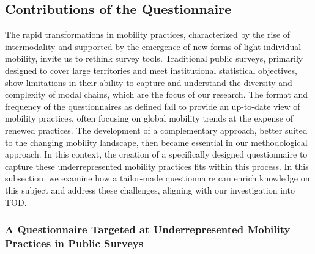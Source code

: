 \begin{refsegment}
\subsection{Contributions of the Questionnaire
    \label{chap3:apports-questionnaire-usagers}
    }

The rapid transformations in mobility practices, characterized by the rise of intermodality and supported by the emergence of new forms of light individual mobility, invite us to rethink survey tools. Traditional public surveys, primarily designed to cover large territories and meet institutional statistical objectives, show limitations in their ability to capture and understand the diversity and complexity of modal chains, which are the focus of our research. The format and frequency of the questionnaires as defined fail to provide an up-to-date view of mobility practices, often focusing on global mobility trends at the expense of renewed practices. The development of a complementary approach, better suited to the changing mobility landscape, then became essential in our methodological approach. In this context, the creation of a specifically designed questionnaire to capture these underrepresented mobility practices fits within this process. In this subsection, we examine how a tailor-made questionnaire can enrich knowledge on this subject and address these challenges, aligning with our investigation into \acrshort{TOD}.%

\subsubsection*{A Questionnaire Targeted at Underrepresented Mobility Practices in Public Surveys
    \label{chap3:apports-questionnaire-usagers-limites-enquetes-traditionnelles}
    }


\end{refsegment}
